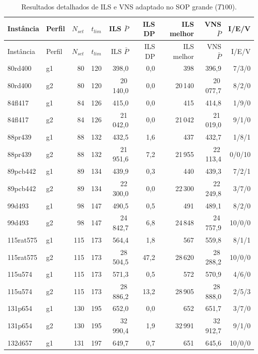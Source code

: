 \begin{longtable}{llrrrrrrr}
\caption{Resultados detalhados de ILS e VNS adaptado no SOP grande ($T100$).}\label{tab:appendix-ils-vns-sop-large}\\
\toprule
Instância & Perfil & $N_{set}$ & $t_{lim}$ & ILS $\bar P$ & ILS DP & ILS melhor & VNS $\bar P$ & I/E/V \\
\midrule
\endfirsthead
\toprule
Instância & Perfil & $N_{set}$ & $t_{lim}$ & ILS $\bar P$ & ILS DP & ILS melhor & VNS $\bar P$ & I/E/V \\
\midrule
\endhead
\bottomrule
\endlastfoot
80rd400 & g1 & 80 & 120 & 398{,}0 & 0{,}0 & 398 & 396{,}9 & 7/3/0 \\
80rd400 & g2 & 80 & 120 & 20\,140{,}0 & 0{,}0 & 20\,140 & 20\,077{,}7 & 8/2/0 \\
84fl417 & g1 & 84 & 126 & 415{,}0 & 0{,}0 & 415 & 414{,}8 & 1/9/0 \\
84fl417 & g2 & 84 & 126 & 21\,042{,}0 & 0{,}0 & 21\,042 & 21\,019{,}0 & 9/1/0 \\
88pr439 & g1 & 88 & 132 & 432{,}5 & 1{,}6 & 437 & 432{,}7 & 1/8/1 \\
88pr439 & g2 & 88 & 132 & 21\,951{,}6 & 7{,}2 & 21\,955 & 22\,113{,}4 & 0/0/10 \\
89pcb442 & g1 & 89 & 134 & 439{,}9 & 0{,}3 & 440 & 439{,}3 & 7/2/1 \\
89pcb442 & g2 & 89 & 134 & 22\,300{,}0 & 0{,}0 & 22\,300 & 22\,249{,}8 & 3/7/0 \\
99d493 & g1 & 98 & 147 & 490{,}5 & 0{,}5 & 491 & 489{,}1 & 8/2/0 \\
99d493 & g2 & 98 & 147 & 24\,842{,}7 & 6{,}8 & 24\,848 & 24\,757{,}9 & 10/0/0 \\
115rat575 & g1 & 115 & 173 & 564{,}4 & 1{,}8 & 567 & 559{,}8 & 8/1/1 \\
115rat575 & g2 & 115 & 173 & 28\,504{,}5 & 47{,}2 & 28\,620 & 28\,288{,}2 & 10/0/0 \\
115u574 & g1 & 115 & 173 & 571{,}3 & 0{,}5 & 572 & 570{,}9 & 4/6/0 \\
115u574 & g2 & 115 & 173 & 28\,886{,}2 & 13{,}2 & 28\,905 & 28\,888{,}0 & 2/5/3 \\
131p654 & g1 & 130 & 195 & 652{,}0 & 0{,}0 & 652 & 651{,}7 & 3/7/0 \\
131p654 & g2 & 130 & 195 & 32\,990{,}4 & 1{,}9 & 32\,991 & 32\,912{,}7 & 9/1/0 \\
132d657 & g1 & 131 & 197 & 649{,}7 & 0{,}7 & 651 & 645{,}6 & 10/0/0 \\

\end{longtable}
